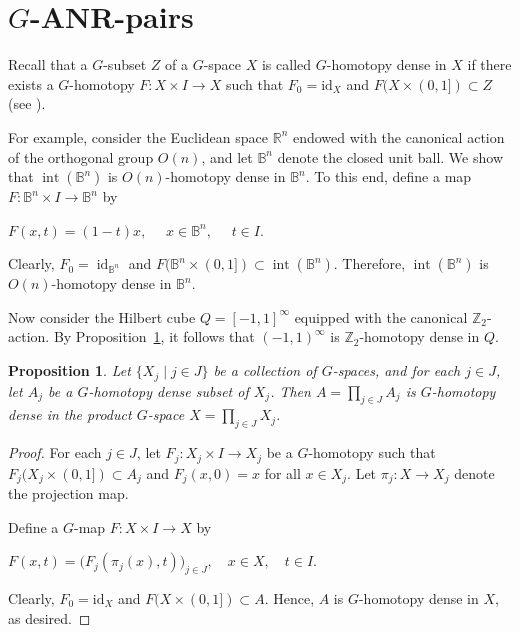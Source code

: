 \documentclass[12pt]{amsart}
\newtheorem{proposition}[theorem]{Proposition}
\theoremstyle{definition}
\begin{document}
	
	\medskip
	
	
	\section{\texorpdfstring{$G$-}-ANR-pairs}\label{sec3}
	Recall that a $G$-subset $Z$ of a $G$-space $X$ is called $G$-homotopy dense in $X$ if there exists a $G$-homotopy $F:X\times I\rightarrow X$ such that $F_0=\mbox{id}_X$ and $F(X\times (0,1])\subset Z$ (see \cite{A8}). 
	
	For example, consider the Euclidean space $\mathbb{R}^n$ endowed with the canonical action of the orthogonal group $O(n)$, and let $\mathbb{B}^n$ denote the closed unit ball. We show that $\operatorname{int}(\mathbb{B}^n)$ is $O(n)$-homotopy dense in $\mathbb{B}^n$. To this end, define a map $F\colon \mathbb{B}^n\times I\to \mathbb{B}^n$ by
	\begin{center}
		$F(x,t)=(1-t)x,\quad$ $x\in \mathbb{B}^n,\quad$ $t\in I$.
	\end{center}
	
	Clearly, $F_0=\operatorname{id}_{\mathbb{B}^n}$ and $F(\mathbb{B}^n\times (0,1])\subset \operatorname{int}(\mathbb{B}^n)$. Therefore, $\operatorname{int}(\mathbb{B}^n)$ is $O(n)$-homotopy dense in $\mathbb{B}^n$.
	
	Now consider the Hilbert cube $Q=[-1,1]^{\infty}$ equipped with the canonical $\mathbb{Z}_2$-action. By Proposition~\ref{producthomotopydense}, it follows that $(-1,1)^{\infty}$ is $\mathbb{Z}_2$-homotopy dense in $Q$.
	
	
	\begin{proposition}\label{producthomotopydense}
		\rm{Let $\{X_j\mid j\in J\}$ be a collection of $G$-spaces, and for each $j\in J$, let $A_j$ be a $G$-homotopy dense subset of $X_j$. Then $A=\prod_{j\in J}A_j$ is $G$-homotopy dense in the product $G$-space $X=\prod_{j\in J}X_j$.}
	\end{proposition}
	
	\begin{proof}
		For each $j\in J$, let $F_j\colon X_j\times I\to X_j$ be a $G$-homotopy such that $F_j(X_j\times (0,1])\subset A_j$ and $F_j(x,0)=x$ for all $x\in X_j$.  Let $\pi_j\colon X\to X_j$ denote the projection map.
		
		Define a $G$-map $F\colon X\times I\to X$ by
		\begin{center}
			$F(x,t)=\big(F_j(\pi_j(x),t)\big)_{j\in J},\quad x\in X,\quad t\in I$.
		\end{center}  
		
		Clearly, $F_0=\text{id}_X$ and $F(X\times (0,1])\subset A$.  Hence, $A$ is $G$-homotopy dense in $X$, as desired.    
	\end{proof}
	
\end{document}
